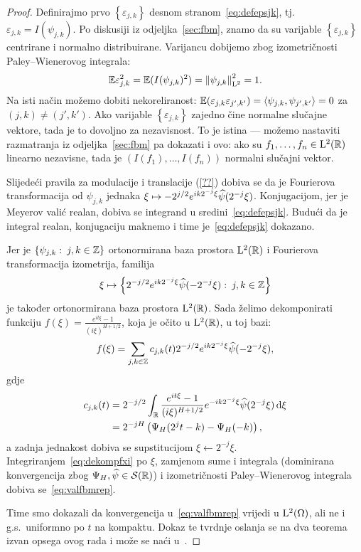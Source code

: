 \documentclass[main.tex]{subfiles}
\begin{document}
\begin{proof}
	Definirajmo prvo  \( \left\{ \varepsilon_{j,k }\right\} \) desnom stranom~\eqref{eq:defepsjk}, tj.\ \( \varepsilon_{j,k} = I(\psi_{j,k}) \).
	Po diskusiji iz odjeljka~\ref{sec:fbm}, znamo da su varijable \( \left\{ \varepsilon_{j,k} \right\} \)
	centrirane i normalno distribuirane. Varijancu dobijemo zbog izometričnosti
	Paley--Wienerovog integrala:
	\begin{equation}
		\mathbb{E}\varepsilon_{j,k}^2 = \mathbb{E}(I(\psi_{j,k})^2) = \left\lVert\psi_{j,k}\right\rVert^2_{\mathrm{L}^2} = 1.
	\end{equation}
	Na isti način možemo dobiti nekoreliranost: \( \mathbb{E} (\varepsilon_{j,k}\varepsilon_{j',k'}) = \left\langle {\psi_{j,k}}, {\psi_{j',k'}} \right\rangle = 0 \) za \( (j,k) \neq (j',k') \). Ako varijable \( \left\{ \varepsilon_{j,k}  \right\} \)
	zajedno čine normalne slučajne vektore, tada je to dovoljno za nezavisnost.
	To je istina --- možemo nastaviti razmatranja iz odjeljka~\ref{sec:fbm} pa dokazati i ovo: ako su \( f_1, \ldots, f_n \in \mathrm{L}^2(\mathbb{R}) \)
	linearno nezavisne, tada je \( \left( I(f_1),\ldots,I(f_n) \right)  \) normalni slučajni vektor.

	Slijedeći pravila za modulacije i translacije (\ref{??})
	dobiva se da je Fourierova transformacija od \( \psi_{j,k} \) jednaka
	\( \xi \mapsto -2^{j/2}e^{ik2^{-j}\xi}\widehat{\psi}(2^{-j}\xi) \).
	Konjugacijom, jer je Meyerov valić realan,
	dobiva se integrand u sredini~\eqref{eq:defepsjk}.
	Budući da je integral realan, konjugaciju maknemo i time
	je~\eqref{eq:defepsjk} dokazano.

	Jer je \( \left\{ \psi_{j,k} \, \colon \, j,k \in \mathbb{Z} \right\} \) ortonormirana baza
	prostora \( \mathrm{L}^2(\mathbb{R}) \) i Fourierova transformacija izometrija, familija
	\[
		\xi \mapsto \left\{ 2^{-j/2} e^{ik2^{-j}\xi}\widehat{\psi}(-2^{-j}\xi) \, \colon \, j,k \in \mathbb{Z} \right\}
	\]
	je također ortonormirana baza prostora \( \mathrm{L}^2(\mathbb{R}) \). Sada želimo dekomponirati
	funkciju \( f(\xi) = \frac{e^{it\xi}-1}{(i\xi)^{H+1/2}} \), koja je očito u \( \mathrm{L}^2(\mathbb{R}) \), u toj bazi:
	\begin{equation} \label{eq:dekompfxi}
		f(\xi) =
		\sum_{j,k \in \mathbb{Z}} c_{j,k}(t) 2^{-j/2}e^{ik2^{-j}\xi}\widehat{\psi}(-2^{-j}\xi),
	\end{equation}
	gdje
	\begin{equation}
		\begin{aligned}
			c_{j,k}(t) & = 2^{-j/2} \int_{\mathbb{R}} \frac{e^{it\xi}-1}{(i\xi)^{H+1/2}}e^{-ik2^{-j}\xi}\widehat{\psi}(2^{-j}\xi) \,\mathrm d \xi
			\\ &= 2^{-jH} \left( \Psi_H(2^jt-k)-\Psi_H(-k) \right),
		\end{aligned}
	\end{equation}
	a zadnja jednakost dobiva se supstitucijom \( \xi \leftarrow 2^{-j}\xi \).
	Integriranjem~\eqref{eq:dekompfxi} po \( \xi \), zamjenom sume i integrala (dominirana konvergencija zbog \( \Psi_H, \widehat{\psi} \in \mathcal S(\mathbb{R}) \)) i izometričnosti Paley--Wienerovog integrala
	dobiva se~\eqref{eq:valfbmrep}.

	Time smo dokazali da konvergencija u~\eqref{eq:valfbmrep} vrijedi u \( \mathrm{L}^2(\Omega) \), ali ne i g.s.\ uniformno po \( t \) na kompaktu. Dokaz te tvrdnje oslanja
	se na dva teorema izvan opsega ovog rada i može se naći u~\cite[tm.~3.15]{ayache}.

\end{proof}
\end{document}
